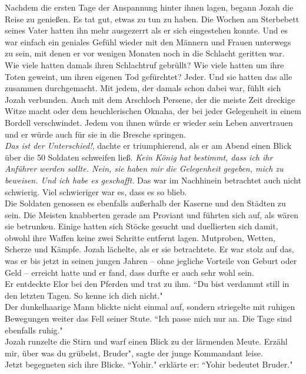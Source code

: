 Nachdem die ersten Tage der Anspannung hinter ihnen lagen, begann Jozah die Reise zu genießen. Es 
tat gut, etwas zu tun zu haben. Die Wochen am Sterbebett seines Vater hatten ihn mehr ausgezerrt 
als er sich eingestehen konnte. Und es war einfach ein geniales Gefühl wieder mit den Männern und 
Frauen unterwegs zu sein, mit denen er vor wenigen Monaten noch in die Schlacht geritten war. Wie 
viele hatten damals ihren Schlachtruf gebrüllt? Wie viele hatten um ihre Toten geweint, um ihren 
eigenen Tod gefürchtet? Jeder. Und sie hatten das alle zusammen durchgemacht. Mit jedem, der damals 
schon dabei war, fühlt sich Jozah verbunden. Auch mit dem Arschloch Persene, der die meiste Zeit 
dreckige Witze macht oder dem heuchlerischen Oknaha, der bei jeder Gelegenheit in einem Bordell 
verschwindet. Jedem von ihnen würde er wieder sein Leben anvertrauen und er würde auch für sie in 
die Bresche springen.\\
\textit{Das ist der Unterschied!}, dachte er triumphierend, als er am Abend einen Blick über die 50 
Soldaten schweifen ließ. \textit{Kein König hat bestimmt, dass ich ihr Anführer werden sollte. 
Nein, sie haben mir die Gelegenheit gegeben, mich zu beweisen. Und ich habe es geschafft.}
Das war im Nachhinein betrachtet auch nicht schwierig. Viel schwieriger war es, dass es so blieb. \\
Die Soldaten genossen es ebenfalls außerhalb der Kaserne und den Städten zu sein. Die Meisten 
knabberten gerade am Proviant und führten sich auf, als wären sie betrunken. Einige hatten sich 
Stöcke gesucht und duellierten sich damit, obwohl ihre Waffen keine zwei Schritte entfernt lagen. 
Mutproben, Wetten, Scherze und Kämpfe. Jozah lächelte, als er sie betrachtete.   Er war stolz auf 
das, was er bis jetzt in seinen jungen Jahren – ohne jegliche Vorteile von Geburt oder Geld – 
erreicht hatte und er fand, dass durfte er auch sehr wohl sein. \\
Er entdeckte Elor bei den Pferden und trat zu ihm. ``Du bist verdammt still in den letzten Tagen. 
So kenne ich dich nicht."\\
Der dunkelhaarige Mann blickte nicht einmal auf, sondern striegelte mit ruhigen Bewegungen weiter 
das Fell seiner Stute. ``Ich passe mich nur an. Die Tage sind ebenfalls ruhig."\\
Jozah runzelte die Stirn und warf einen Blick zu der lärmenden Meute. Erzähl mir, über was du 
grübelst, Bruder", sagte der junge Kommandant leise. \\
Jetzt begegneten sich ihre Blicke. ``Yohir." erklärte er: ``Yohir bedeutet Bruder."
